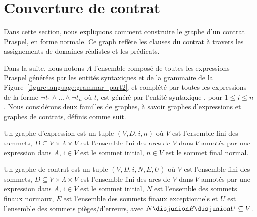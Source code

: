 \section{Couverture de contrat}
\label{section:test:contract}

Dans cette section, nous expliquons comment construire le graphe d'un contrat
Praspel, en forme normale. Ce graph reflète les clauses du contrat à travers les
assignements de domaines réalistes et les prédicats.

Dans la suite, nous notons $A$ l'ensemble composé de toutes les expressions
Praspel générées par les entités syntaxiques  et
 de la grammaire de la
Figure~\ref{figure:language:grammar_part2}, et complété par toutes les
expressions de la forme $\neg t_1 \land \dots \land \neg t_n$ où $t_i$ est
généré par l'entité syntaxique , pour $1 \leq i \leq
n$. Nous considérons deux familles de graphes, à savoir {\strong graphes
d'expressions} et {\strong graphes de contrats}, définis comme suit.

\begin{definition}

Un {\strong graphe d'expression} est un tuple $(V, D, i, n)$ où $V$ est
l'ensemble fini des {\strong sommets}, $D \subseteq V \times A \times V$ est
l'ensemble fini des {\strong arcs} de $V$ dans $V$ annotés par une {\strong
expression} dans $A$, $i \in V$ est le {\strong sommet initial}, $n \in V$ est
le {\strong sommet final normal}.

\end{definition}

\begin{definition}

Un {\strong graphe de contrat} est un tuple $(V, D, i, N, E, U)$ où $V$ est
l'ensemble fini des {\strong sommets}, $D \subseteq V \times A \times V$ est
l'ensemble fini des {\strong arcs} de $V$ dans $V$ annotés par une expression
dans $A$, $i \in V$ est le {\strong sommet initial}, $N$ est l'ensemble des
{\strong sommets finaux normaux}, $E$ est l'ensemble des {\strong sommets finaux
exceptionnels} et $U$ est l'ensemble des {\strong sommets pièges/d'erreurs},
avec $N \disjunion E \disjunion U \subseteq V$.

\end{definition}

